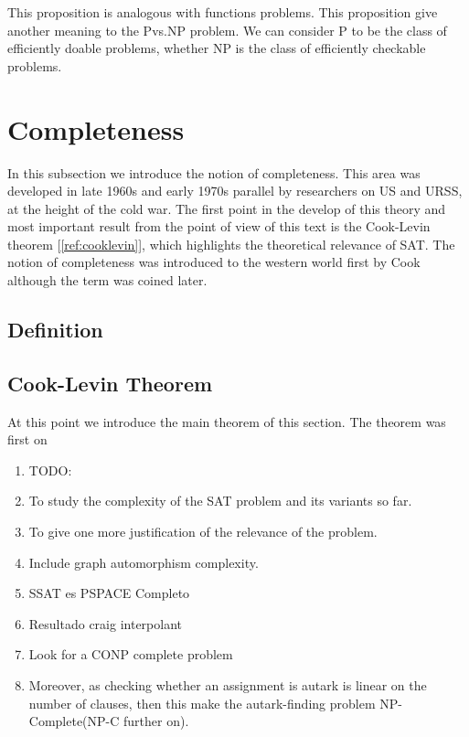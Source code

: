 This proposition is analogous with functions problems. This proposition give another meaning to the Pvs.NP problem. We can consider P to be the class of efficiently doable problems, whether NP is the class of efficiently checkable problems.




\section{Completeness}

In this subsection we introduce the notion of completeness. This area was developed in late 1960s and early 1970s parallel by researchers on US and URSS, at the height of the cold war. The first point in the develop of this theory and most important result from the point of view of this text is the Cook-Levin theorem [\ref{ref:cooklevin}], which highlights the theoretical relevance of SAT. The notion of completeness was introduced to the western world first by Cook \cite{cook1971complexity} although the term was coined later. 

\subsection{Definition}



\subsection{Cook-Levin Theorem}
At this point we introduce the main theorem of this section. The theorem was first on \cite{cook1971complexity} 
\begin{theorem}\label{ref:cooklevin}

\end{theorem}

\begin{enumerate}
  \item TODO:
  \item To study the complexity of the SAT problem and its variants so far.
  \item To give one more justification of the relevance of the problem.
  \item Include graph automorphism complexity.
  \item SSAT es PSPACE Completo
  \item Resultado craig interpolant
  \item Look for a CONP complete problem
  \item Moreover, as checking whether an assignment is autark is linear on the number of clauses, then this make the autark-finding problem NP-Complete(NP-C further on).
  \end{enumerate}

